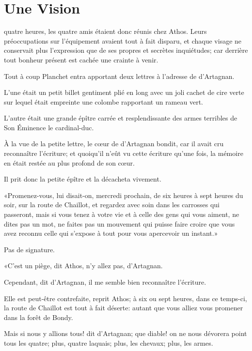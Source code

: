 
\chapter{Une Vision} 
	
\lettrine{}{} quatre heures, les quatre amis étaient donc réunis chez Athos. Leurs préoccupations sur l'équipement avaient tout à fait disparu, et chaque visage ne conservait plus l'expression que de ses propres et secrètes inquiétudes; car derrière tout bonheur présent est cachée une crainte à venir. 

Tout à coup Planchet entra apportant deux lettres à l'adresse de d'Artagnan. 

L'une était un petit billet gentiment plié en long avec un joli cachet de cire verte sur lequel était empreinte une colombe rapportant un rameau vert. 

L'autre était une grande épître carrée et resplendissante des armes terribles de Son Éminence le cardinal-duc. 

À la vue de la petite lettre, le cœur de d'Artagnan bondit, car il avait cru reconnaître l'écriture; et quoiqu'il n'eût vu cette écriture qu'une fois, la mémoire en était restée au plus profond de son cœur. 

Il prit donc la petite épître et la décacheta vivement. 

«Promenez-vous, lui disait-on, mercredi prochain, de six heures à sept heures du soir, sur la route de Chaillot, et regardez avec soin dans les carrosses qui passeront, mais si vous tenez à votre vie et à celle des gens qui vous aiment, ne dites pas un mot, ne faites pas un mouvement qui puisse faire croire que vous avez reconnu celle qui s'expose à tout pour vous apercevoir un instant.» 

Pas de signature. 

«C'est un piège, dit Athos, n'y allez pas, d'Artagnan. 

\speak  Cependant, dit d'Artagnan, il me semble bien reconnaître l'écriture. 

\speak  Elle est peut-être contrefaite, reprit Athos; à six ou sept heures, dans ce temps-ci, la route de Chaillot est tout à fait déserte: autant que vous alliez vous promener dans la forêt de Bondy. 

\speak  Mais si nous y allions tous! dit d'Artagnan; que diable! on ne nous dévorera point tous les quatre; plus, quatre laquais; plus, les chevaux; plus, les armes. 

